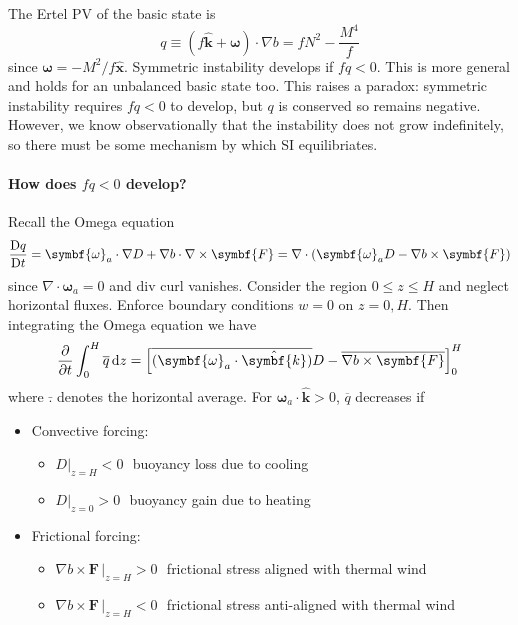 \documentclass{jknotes}
\begin{document}
The Ertel PV of the basic state is
\begin{equation}
	 q \equiv (f\hat{\symbf{k}} + \symbf{\omega})\cdot\nabla b = fN^2 -
	 \frac{M^4}{f}
 \end{equation}
 since $\symbf{\omega} = -M^2/f \hat{\symbf{x}}$. Symmetric instability
 develops if $fq < 0$. This is more general and holds for an unbalanced basic
 state too. This raises a paradox: symmetric instability requires $fq < 0$ to
 develop, but $q$ is conserved so remains negative. However, we know
 observationally that the instability does not grow indefinitely, so there
 must be some mechanism by which SI equilibriates. 
 
 \paragraph{How does $fq < 0$ develop?}
 Recall the Omega equation
 \begin{equation}
	 \frac{\diffD q}{\diffD t} = \symbf{\omega}_a \cdot \nabla D + \nabla b
	 \cdot \nabla \times \symbf{F} = \nabla \cdot (\symbf{\omega}_a D - \nabla
	 b \times \symbf{F})
 \end{equation}
since $\nabla \cdot \symbf{\omega}_a = 0$ and div curl vanishes. Consider the
region $0 \le z \le H$ and neglect horizontal fluxes.  Enforce boundary
conditions $w = 0$ on $z=0, H$. Then integrating the Omega equation we have
\begin{equation}
	\frac{\partial}{\partial t} \int_0^H \overline{q} \, \diffd z = \left[
		\overline{(\symbf{\omega}_a \cdot \hat{\symbf{k}})}D - \overline{\nabla b \times
	\symbf{F}}\right]_0^H
\end{equation}
where $\bar{.}$ denotes the horizontal average. For $\symbf{\omega}_a \cdot
\hat{\symbf{k}} > 0$, $\overline{q}$ decreases if
\begin{itemize}
	\item Convective forcing:
		\begin{itemize}
			\item $\left.D\right|_{z=H} < 0$ \,\,buoyancy loss due to cooling
			\item $\left.D\right|_{z=0} > 0$ \,\,buoyancy gain due to heating
		\end{itemize}
	\item Frictional forcing:
		\begin{itemize}
			\item $\nabla b \times \left.\symbf{F}\, \right|_{z=H} > 0$\,\,
					frictional stress aligned with thermal wind
			\item $\nabla b \times \left.\symbf{F} \,\right|_{z=H} < 0$\,\,
					frictional stress anti-aligned with thermal wind
		\end{itemize}
\end{itemize}
\end{document}
